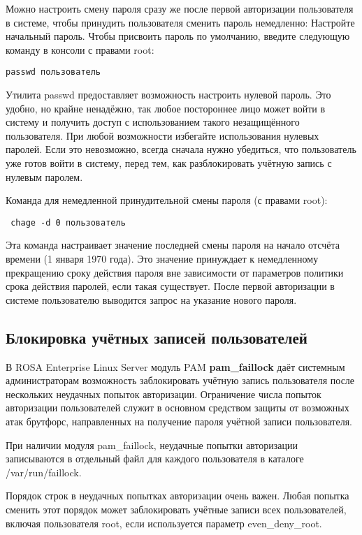 \documentclass[a4paper,10pt,twoside]{article}
\begin{document}
Можно настроить смену пароля сразу же после первой авторизации пользователя в системе, чтобы принудить пользователя сменить пароль немедленно:
Настройте начальный пароль. Чтобы присвоить пароль по умолчанию, введите следующую команду в консоли с правами root:
\begin{verbatim}
passwd пользователь
\end{verbatim} 

Утилита passwd предоставляет возможность настроить нулевой пароль. Это удобно, но крайне ненадёжно, так любое постороннее лицо может войти в систему и получить доступ с использованием такого незащищённого пользователя. При любой возможности избегайте использования нулевых паролей. Если это невозможно, всегда сначала нужно убедиться, что пользователь уже готов войти в систему, перед тем, как разблокировать учётную запись с нулевым паролем.

Команда для немедленной принудительной смены пароля (с правами root):
\begin{verbatim}
 chage -d 0 пользователь
\end{verbatim} 

Эта команда настраивает значение последней смены пароля на начало отсчёта времени (1 января 1970 года). Это значение принуждает к немедленному прекращению сроку действия пароля вне зависимости от параметров политики срока действия паролей, если такая существует. После первой авторизации в системе пользователю выводится запрос на указание нового пароля.


\subsection{Блокировка учётных записей пользователей}
В ROSA Enterprise Linux Server  модуль PAM \textbf{pam\_faillock} даёт системным администраторам возможность заблокировать учётную запись пользователя после нескольких неудачных попыток авторизации. Ограничение числа попыток авторизации пользователей служит в основном средством защиты от возможных атак брутфорс, направленных на получение пароля учётной записи пользователя.

При наличии модуля pam\_faillock, неудачные попытки авторизации записываются в отдельный файл для каждого пользователя в каталоге /var/run/faillock.

Порядок строк в неудачных попытках авторизации очень важен. Любая попытка сменить этот порядок может заблокировать учётные записи всех пользователей, включая пользователя root, если используется параметр even\_deny\_root.
\end{document}
